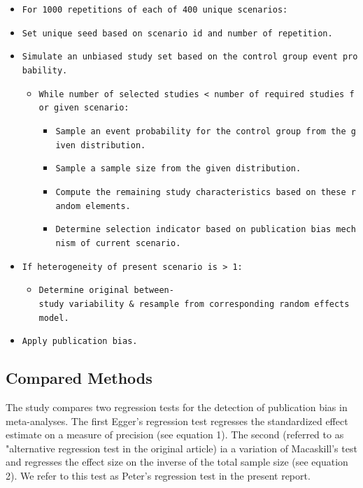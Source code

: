 \documentclass[
  english,
  doc,floatsintext,draftall]{apa6}
\providecommand{\tightlist}{%
  \setlength{\itemsep}{0pt}\setlength{\parskip}{0pt}}
\begin{document}
\begin{itemize}
\tightlist
\item
  \texttt{For\ 1000\ repetitions\ of\ each\ of\ 400\ unique\ scenarios:}
\item
  \texttt{Set\ unique\ seed\ based\ on\ scenario\ id\ and\ number\ of\ repetition.}
\item
  \texttt{Simulate\ an\ unbiased\ study\ set\ based\ on\ the\ control\ group\ event\ probability.}

  \begin{itemize}
  \tightlist
  \item
    \texttt{While\ number\ of\ selected\ studies\ \textless{}\ number\ of\ required\ studies\ for\ given\ scenario:}

    \begin{itemize}
    \tightlist
    \item
      \texttt{Sample\ an\ event\ probability\ for\ the\ control\ group\ from\ the\ given\ distribution.}
    \item
      \texttt{Sample\ a\ sample\ size\ from\ the\ given\ distribution.}
    \item
      \texttt{Compute\ the\ remaining\ study\ characteristics\ based\ on\ these\ random\ elements.}
    \item
      \texttt{Determine\ selection\ indicator\ based\ on\ publication\ bias\ mechnism\ of\ current\ scenario.}
    \end{itemize}
  \end{itemize}
\item
  \texttt{If\ heterogeneity\ of\ present\ scenario\ is\ \textgreater{}\ 1:}

  \begin{itemize}
  \tightlist
  \item
    \texttt{Determine\ original\ between-study\ variability\ \&\ resample\ from\ corresponding\ random\ effects\ model.}
  \end{itemize}
\item
  \texttt{Apply\ publication\ bias.}
\end{itemize}

\hypertarget{compared-methods}{%
\subsection{Compared Methods}\label{compared-methods}}

The study compares two regression tests for the detection of publication bias in meta-analyses.
The first Egger's regression test regresses the standardized effect estimate on a measure of precision (see equation 1).
The second (referred to as "alternative regression test in the original article) ia a variation of Macaskill's test and regresses the effect size on the inverse of the total sample size (see equation 2).
We refer to this test as Peter's regression test in the present report.
\end{document}
